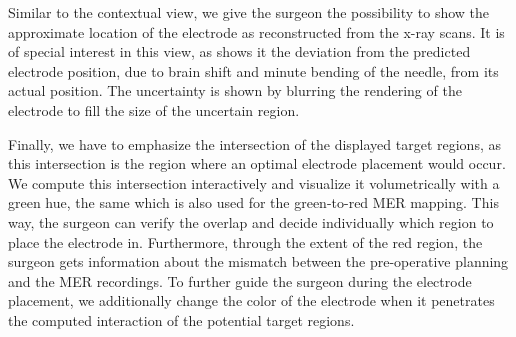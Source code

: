 \documentclass[review]{vgtc}                 %
\begin{document}
Similar to the contextual view, we give the surgeon the possibility to show the approximate location of the electrode as reconstructed from the x-ray scans. It is of special interest in this view, as shows it the deviation from the predicted electrode position, due to brain shift and minute bending of the needle, from its actual position. The uncertainty is shown by blurring the rendering of the electrode to fill the size of the uncertain region.

Finally, we have to emphasize the intersection of the displayed target regions, as this intersection is the region where an optimal electrode placement would occur. We compute this intersection interactively and visualize it volumetrically with a green hue, the same which is also used for the green-to-red MER mapping. This way, the surgeon can verify the overlap and decide individually which region to place the electrode in. Furthermore, through the extent of the red region, the surgeon gets information about the mismatch between the pre-operative planning and the MER recordings. To further guide the surgeon during the electrode placement, we additionally change the color of the electrode when it penetrates the computed interaction of the potential target regions.
\end{document}
